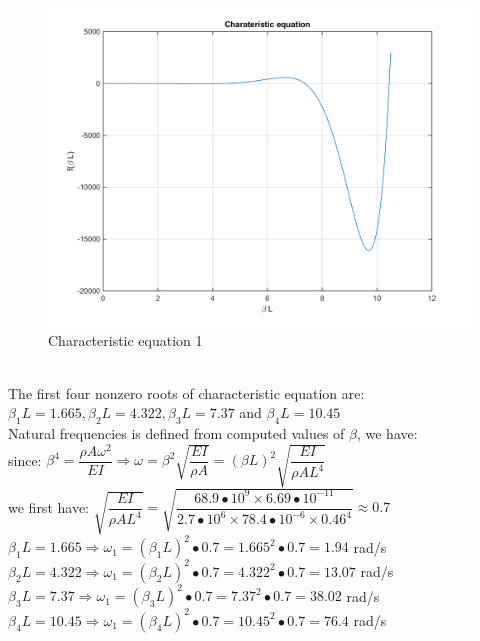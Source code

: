\documentclass[14pt,a4paper]{article}
\begin{document}
\begin{enumerate}
\begin{figure}[htp]
		\includegraphics[scale=0.4]{fn1_VB1_2.png}
		\caption{Characteristic equation 1}
	\end{figure}\\
	The first four nonzero roots of characteristic equation are: $\beta_1L = 1.665, \beta_2L = 4.322, \beta_3L = 7.37 $ and $\beta_4L = 10.45$\\
	Natural frequencies is defined from computed values of $\beta$, we have:\\
	since: $ \beta^4 = \dfrac{\rho A\omega^2}{EI} \Rightarrow \omega = \beta^2\sqrt{\dfrac{EI}{\rho A}} = (\beta L)^2\sqrt{\dfrac{EI}{\rho AL^4}}$\\
	we first have: $\sqrt{\dfrac{EI}{\rho AL^4}} = \sqrt{\dfrac{68.9\bullet 10^9 \times 6.69\bullet 10^{-11}}{2.7\bullet10^6 \times 78.4\bullet10^{-6}\times 0.46^4}} \approx 0.7$\\
	\hspace*{1cm} $\beta_1L = 1.665 \Rightarrow \omega_1 = (\beta_1L)^2\bullet 0.7 = 1.665^2\bullet 0.7 = 1.94$ rad/s\\
	\hspace*{1cm} $\beta_2L = 4.322 \Rightarrow \omega_1 = (\beta_2L)^2\bullet 0.7 = 4.322^2\bullet 0.7 = 13.07$ rad/s\\
	\hspace*{1cm} $\beta_3L = 7.37 \Rightarrow \omega_1 = (\beta_3L)^2\bullet 0.7 = 7.37^2\bullet 0.7 = 38.02$ rad/s\\
	\hspace*{1cm} $\beta_4L = 10.45 \Rightarrow \omega_1 = (\beta_4L)^2\bullet 0.7 = 10.45^2\bullet 0.7 = 76.4$ rad/s\\

\end{enumerate}
\end{document}
